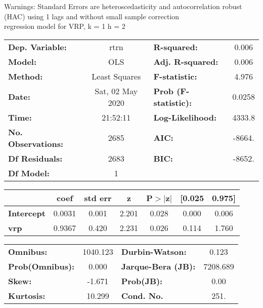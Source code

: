 Warnings: \newline
 [1] Standard Errors are heteroscedasticity and autocorrelation robust (HAC) using 1 lags and without small sample correction\\ 

regression model for VRP, k = 1 h = 2\begin{center}
\begin{tabular}{lclc}
\toprule
\textbf{Dep. Variable:}    &       rtrn       & \textbf{  R-squared:         } &     0.006   \\
\textbf{Model:}            &       OLS        & \textbf{  Adj. R-squared:    } &     0.006   \\
\textbf{Method:}           &  Least Squares   & \textbf{  F-statistic:       } &     4.976   \\
\textbf{Date:}             & Sat, 02 May 2020 & \textbf{  Prob (F-statistic):} &   0.0258    \\
\textbf{Time:}             &     21:52:11     & \textbf{  Log-Likelihood:    } &    4333.8   \\
\textbf{No. Observations:} &        2685      & \textbf{  AIC:               } &    -8664.   \\
\textbf{Df Residuals:}     &        2683      & \textbf{  BIC:               } &    -8652.   \\
\textbf{Df Model:}         &           1      & \textbf{                     } &             \\
\bottomrule
\end{tabular}
\begin{tabular}{lcccccc}
                   & \textbf{coef} & \textbf{std err} & \textbf{z} & \textbf{P$> |$z$|$} & \textbf{[0.025} & \textbf{0.975]}  \\
\midrule
\textbf{Intercept} &       0.0031  &        0.001     &     2.201  &         0.028        &        0.000    &        0.006     \\
\textbf{vrp}       &       0.9367  &        0.420     &     2.231  &         0.026        &        0.114    &        1.760     \\
\bottomrule
\end{tabular}
\begin{tabular}{lclc}
\textbf{Omnibus:}       & 1040.123 & \textbf{  Durbin-Watson:     } &    0.123  \\
\textbf{Prob(Omnibus):} &   0.000  & \textbf{  Jarque-Bera (JB):  } & 7208.689  \\
\textbf{Skew:}          &  -1.671  & \textbf{  Prob(JB):          } &     0.00  \\
\textbf{Kurtosis:}      &  10.299  & \textbf{  Cond. No.          } &     251.  \\
\bottomrule
\end{tabular}
\end{center}

